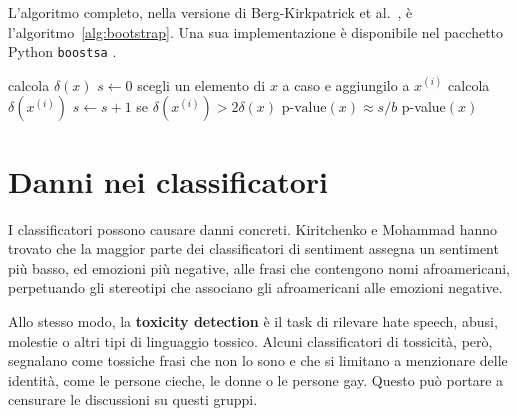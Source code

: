 L'algoritmo completo, nella versione di Berg-Kirkpatrick et al.\ \cite{berg2012}, è l'algoritmo~\ref{alg:bootstrap}. Una sua implementazione è disponibile nel pacchetto Python \texttt{boostsa} \cite{fornaciari2022}.

\begin{algorithm}[htbp]
\caption{Il paired bootstrap test.}
\label{alg:bootstrap}
\begin{algorithmic}[1]
  \State calcola $\delta(x)$ 
  \State $s \gets 0$
     
      \State scegli un elemento di $x$ a caso e aggiungilo a $x^{(i)}$
    \EndFor
    \State calcola $\delta(x^{(i)})$ 
    \State $s \gets s + 1$ se $\delta(x^{(i)}) > 2\delta(x)$
  \EndFor
  \State $\text{p-value}(x) \approx s / b$ 
  \State \Return p-value$(x)$ 
\EndFunction
\end{algorithmic}
\end{algorithm}

\section{Danni nei classificatori}
I classificatori possono causare danni concreti. Kiritchenko e Mohammad \cite{kiritchenko2018} hanno trovato che la maggior parte dei classificatori di sentiment assegna un sentiment più basso, ed emozioni più negative, alle frasi che contengono nomi afroamericani, perpetuando gli stereotipi che associano gli afroamericani alle emozioni negative.

Allo stesso modo, la \textbf{toxicity detection} è il task di rilevare hate speech, abusi, molestie o altri tipi di linguaggio tossico. Alcuni classificatori di tossicità, però, segnalano come tossiche frasi che non lo sono e che si limitano a menzionare delle identità, come le persone cieche, le donne o le persone gay. Questo può portare a censurare le discussioni su questi gruppi.

